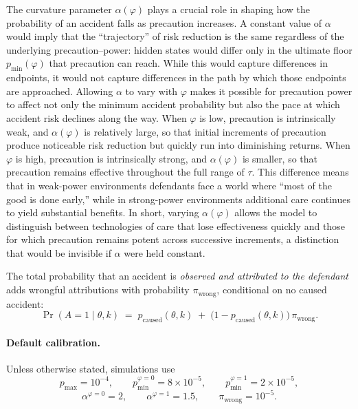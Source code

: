\documentclass{article}
\begin{document}
\begin{enumerate}
The curvature parameter $\alpha(\varphi)$ plays a crucial role in shaping how the probability of an accident falls as precaution increases. A constant value of $\alpha$ would imply that the “trajectory” of risk reduction is the same regardless of the underlying precaution–power: hidden states would differ only in the ultimate floor $p_{\min}(\varphi)$ that precaution can reach. While this would capture differences in endpoints, it would not capture differences in the path by which those endpoints are approached. Allowing $\alpha$ to vary with $\varphi$ makes it possible for precaution power to affect not only the minimum accident probability but also the pace at which accident risk declines along the way. When $\varphi$ is low, precaution is intrinsically weak, and $\alpha(\varphi)$ is relatively large, so that initial increments of precaution produce noticeable risk reduction but quickly run into diminishing returns. When $\varphi$ is high, precaution is intrinsically strong, and $\alpha(\varphi)$ is smaller, so that precaution remains effective throughout the full range of $\tau$. This difference means that in weak-power environments defendants face a world where “most of the good is done early,” while in strong-power environments additional care continues to yield substantial benefits. In short, varying $\alpha(\varphi)$ allows the model to distinguish between technologies of care that lose effectiveness quickly and those for which precaution remains potent across successive increments, a distinction that would be invisible if $\alpha$ were held constant.



The total probability that an accident is \emph{observed and attributed to the defendant} adds wrongful attributions with probability $\pi_{\mathrm{wrong}}$, conditional on no caused accident:
\begin{equation}
\Pr(A=1\mid \theta,k)
\;=\;
p_{\mathrm{caused}}(\theta,k)
\;+\;
\bigl(1-p_{\mathrm{caused}}(\theta,k)\bigr)\,\pi_{\mathrm{wrong}}.
\label{eq:accident-total}
\end{equation}

\paragraph{Default calibration.}
Unless otherwise stated, simulations use
\[
p_{\max}=10^{-4},\qquad
p_{\min}^{\varphi=0}=8\times 10^{-5},\qquad
p_{\min}^{\varphi=1}=2\times 10^{-5},
\]
\[
\alpha^{\varphi=0}=2,\qquad
\alpha^{\varphi=1}=1.5,\qquad
\pi_{\mathrm{wrong}}=10^{-5}.
\]




\end{enumerate}
\end{document}
